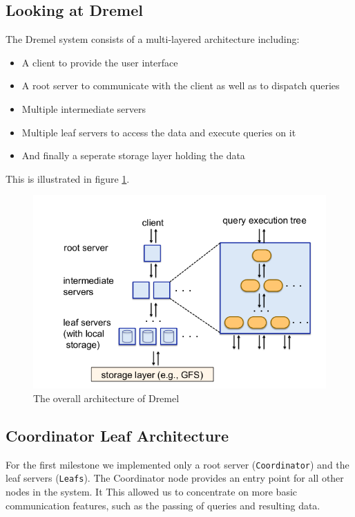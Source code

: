   \subsection{Looking at Dremel}
  The Dremel \cite{melnik2010dremel} system consists of a multi-layered
  architecture including:
  \begin{itemize}
    \item A client to provide the user interface
    \item A root server to communicate with the client as well as to dispatch
      queries
    \item Multiple intermediate servers
    \item Multiple leaf servers to access the data and execute queries on it
    \item And finally a seperate storage layer holding the data
  \end{itemize}
  This is illustrated in figure \ref{netarch}.
  \begin{figure}[ht]
    \centering
    \includegraphics[width=\textwidth]{images/net-arch}
    \caption{The overall architecture of Dremel\cite{melnik2010dremel}}
    \label{netarch}
  \end{figure}
  \subsection{Coordinator Leaf Architecture}
    For the first milestone we implemented only a root server
    (\texttt{Coordinator}) and the leaf servers (\texttt{Leafs}).
    The Coordinator node provides an entry point for all other nodes
    in the system. It This allowed us to concentrate on more basic
    communication features, such as the passing of queries and
    resulting data.
